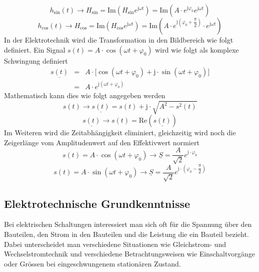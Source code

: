 \begin{equation}
\boxed{h_{\text{sin}}\left(t\right)\longrightarrow H_{\text{sin}}=\text{Im}\left(H_{\text{sin}}e^{\text{j}\omega t}\right)=\text{Im}\left(A\cdot e^{\text{j}\varphi_0}e^{\text{j}\omega t}\right)}
\end{equation}
\begin{equation}
\boxed{h_{\text{cos}}\left(t\right)\longrightarrow H_{\text{cos}}=\text{Im}\left(H_{\text{cos}}e^{\text{j}\omega t}\right)=\text{Im}\left(A\cdot e^{\text{j}\left(\varphi_0+\dfrac{\pi}{2}\right)}\cdot e^{\text{j}\omega t}\right)}
\end{equation}
In der Elektrotechnik wird die Transformation in den Bildbereich wie folgt definiert. Ein Signal $s\left(t\right)=A\cdot \cos\left(\omega t+\varphi_0\right)$ wird wie folgt als komplexe Schwingung definiert
\begin{equation}
\boxed{
\begin{array}{lll}
\underline{s\left(t\right)}&=&A\cdot \Big[\cos\left(\omega t+\varphi_0\right)+\text{j}\cdot \sin\left(\omega t+\varphi_0\right)\Big]\\
&=&A\cdot e^{\text{j}\left(\omega t +\varphi_0\right)}
\end{array}
}
\end{equation}
Mathematisch kann dies wie folgt angegeben werden
\begin{equation}
\boxed{s\left(t\right)\longrightarrow \underline{s\left(t\right)}=s\left(t\right)+\text{j}\cdot \sqrt{A^2-s^2\left(t\right)}}
\end{equation}
\begin{equation}
\boxed{\underline{s\left(t\right)}\longrightarrow s\left(t\right)=\text{Re}\left(\underline{s\left(t\right)}\right)}
\end{equation}
Im Weiteren wird die Zeitabhängigkeit eliminiert, gleichzeitig wird noch die Zeigerlänge vom Amplitudenwert auf den Effektivwert normiert
\begin{equation} 
\boxed{s\left(t\right)=A\cdot \cos\left(\omega t+\varphi_0\right)\rightarrow \underline{S}=\dfrac{A}{\sqrt{2}}e^{\text{j}\cdot \varphi_0}}
\end{equation} 
\begin{equation} 
\boxed{s\left(t\right)=A\cdot \sin\left(\omega t+\varphi_0\right)\rightarrow \underline{S}=\dfrac{A}{\sqrt{2}}e^{\text{j}\cdot \left(\varphi_0-\dfrac{\pi}{2}\right)}}
\end{equation} 
\subsection{Elektrotechnische Grundkenntnisse}
Bei elektrischen Schaltungen interessiert man sich oft für die Spannung über den Bauteilen, den Strom in den Bauteilen und die Leistung die ein Bauteil bezieht. Dabei unterscheidet man verschiedene Situationen wie Gleichstrom- und Wechselstromtechnik und verschiedene Betrachtungsweisen wie Einschaltvorgänge oder Grössen bei eingeschwungenem stationären Zustand.

